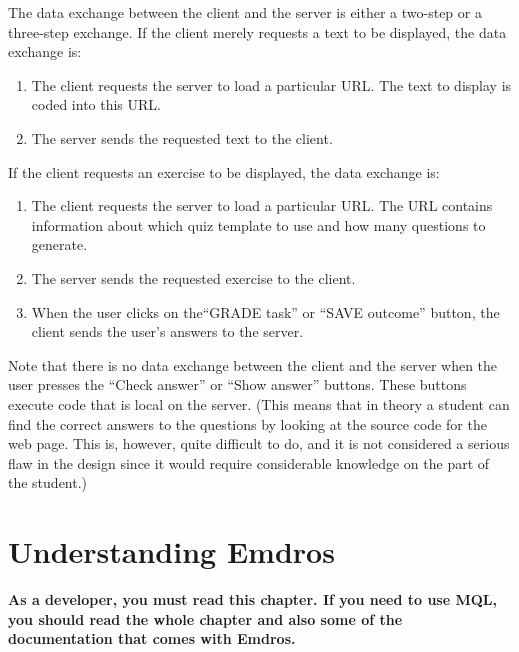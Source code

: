 \documentclass[11pt,oneside,a4paper]{memoir}
\begin{document}
The data exchange between the client and the server is either a two-step or a three-step exchange.
If the client merely requests a text to be displayed, the data exchange is:

\begin{enumerate}
\item The client requests the server to load a particular URL. The text to display is coded into
  this URL.
\item The server sends the requested text to the client.
\end{enumerate}

If the client requests an exercise to be displayed, the data exchange is:

\begin{enumerate}
\item The client requests the server to load a particular URL. The URL contains information about which
  quiz template to use and how many questions to generate.
\item The server sends the requested exercise to the client.
\item When the user clicks on the``GRADE task''%
   or ``SAVE
  outcome'' button, the client sends the user's
  answers to the server.
\end{enumerate}

Note that there is no data exchange between the client and the server when the user presses the
``Check answer'' or ``Show answer''%
buttons. These buttons execute code that is local on the server. (This means that in theory a
student can find the correct answers to the questions by looking at the source code for the web
page. This is, however, quite difficult to do, and it is not considered a serious flaw in the design
since it would require considerable knowledge on the part of the student.)


\chapter{Understanding Emdros}\label{chap-emdros-use}

\textbf{As a developer, you must read this chapter. If you need to use MQL, you should read the
  whole chapter and also some of the documentation that comes with Emdros.}
\end{document}
